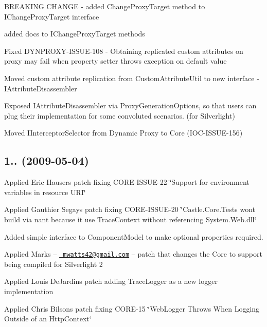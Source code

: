 \begin{DoxyItemize}
\item B\+R\+E\+A\+K\+I\+NG C\+H\+A\+N\+GE -\/ added Change\+Proxy\+Target method to I\+Change\+Proxy\+Target interface
\item added docs to I\+Change\+Proxy\+Target methods
\item Fixed D\+Y\+N\+P\+R\+O\+X\+Y-\/\+I\+S\+S\+U\+E-\/108 -\/ Obtaining replicated custom attributes on proxy may fail when property setter throws exception on default value
\item Moved custom attribute replication from Custom\+Attribute\+Util to new interface -\/ I\+Attribute\+Disassembler
\item Exposed I\+Attribute\+Disassembler via Proxy\+Generation\+Options, so that users can plug their implementation for some convoluted scenarios. (for Silverlight)
\item Moved I\+Interceptor\+Selector from Dynamic Proxy to Core (I\+O\+C-\/\+I\+S\+S\+U\+E-\/156)
\end{DoxyItemize}

\subsection*{1.. (2009-\/05-\/04)}


\begin{DoxyItemize}
\item Applied Eric Hauser\textquotesingle{}s patch fixing C\+O\+R\+E-\/\+I\+S\+S\+U\+E-\/22 \char`\"{}\+Support for environment variables in resource U\+R\+I\char`\"{}
\item Applied Gauthier Segay\textquotesingle{}s patch fixing C\+O\+R\+E-\/\+I\+S\+S\+U\+E-\/20 \char`\"{}\+Castle.\+Core.\+Tests won\textquotesingle{}t build via nant because it use Trace\+Context without referencing System.\+Web.\+dll\char`\"{}
\item Added simple interface to Component\+Model to make optional properties required.
\item Applied Mark\textquotesingle{}s -- \href{mailto:mwatts42@gmail.com}{\texttt{ mwatts42@gmail.\+com}} -- patch that changes the Core to support being compiled for Silverlight 2
\item Applied Louis De\+Jardin\textquotesingle{}s patch adding Trace\+Logger as a new logger implementation
\item Applied Chris Bilson\textquotesingle{}s patch fixing C\+O\+R\+E-\/15 \char`\"{}\+Web\+Logger Throws When Logging Outside of an Http\+Context\char`\"{}
\end{DoxyItemize}

